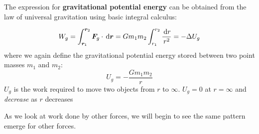 The expression for \textbf{gravitational potential energy} can be obtained
from the law of universal gravitation using basic integral calculus:

\begin{equation}
  W_g = \int_{\bm r_1}^{\bm r_2}\bm F_g\cdot\dl{\bm r}
  = Gm_1m_2 \int_{r_1}^{r_2}\frac{\dl r}{r^2} = -\Delta U_g
\end{equation}
where we again define the gravitational potential energy stored between two
point masses $m_1$ and $m_2$:
\begin{equation}
  \boxed{U_g=-\frac{Gm_1m_2}r}
\end{equation}
$U_g$ is the work required to move two objects from $r$ to $\infty$. $U_g=0$ at
$r=\infty$ and \emph{decrease} as $r$ decreases




%  

As we look at work done by other forces, we will begin to see the same pattern
emerge for other forces.



